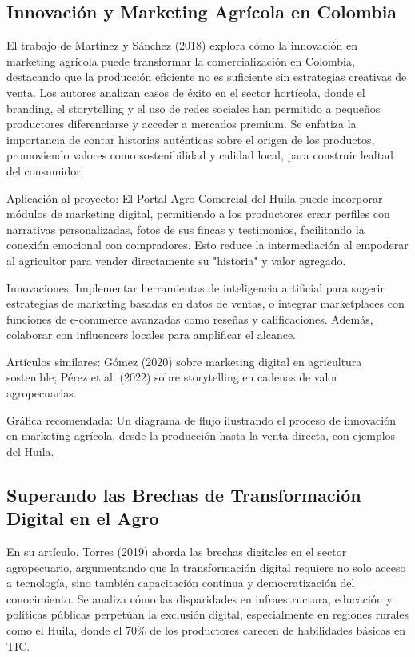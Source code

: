 \subsection{Innovación y Marketing Agrícola en Colombia}

El trabajo de Martínez y Sánchez (2018) explora cómo la innovación en marketing agrícola puede transformar la comercialización en Colombia, destacando que la producción eficiente no es suficiente sin estrategias creativas de venta. Los autores analizan casos de éxito en el sector hortícola, donde el branding, el storytelling y el uso de redes sociales han permitido a pequeños productores diferenciarse y acceder a mercados premium. Se enfatiza la importancia de contar historias auténticas sobre el origen de los productos, promoviendo valores como sostenibilidad y calidad local, para construir lealtad del consumidor.

Aplicación al proyecto: El Portal Agro Comercial del Huila puede incorporar módulos de marketing digital, permitiendo a los productores crear perfiles con narrativas personalizadas, fotos de sus fincas y testimonios, facilitando la conexión emocional con compradores. Esto reduce la intermediación al empoderar al agricultor para vender directamente su "historia" y valor agregado.

Innovaciones: Implementar herramientas de inteligencia artificial para sugerir estrategias de marketing basadas en datos de ventas, o integrar marketplaces con funciones de e-commerce avanzadas como reseñas y calificaciones. Además, colaborar con influencers locales para amplificar el alcance.

Artículos similares: Gómez (2020) sobre marketing digital en agricultura sostenible; Pérez et al. (2022) sobre storytelling en cadenas de valor agropecuarias.

Gráfica recomendada: Un diagrama de flujo ilustrando el proceso de innovación en marketing agrícola, desde la producción hasta la venta directa, con ejemplos del Huila.

\subsection{Superando las Brechas de Transformación Digital en el Agro}

En su artículo, Torres (2019) aborda las brechas digitales en el sector agropecuario, argumentando que la transformación digital requiere no solo acceso a tecnología, sino también capacitación continua y democratización del conocimiento. Se analiza cómo las disparidades en infraestructura, educación y políticas públicas perpetúan la exclusión digital, especialmente en regiones rurales como el Huila, donde el 70\% de los productores carecen de habilidades básicas en TIC.

